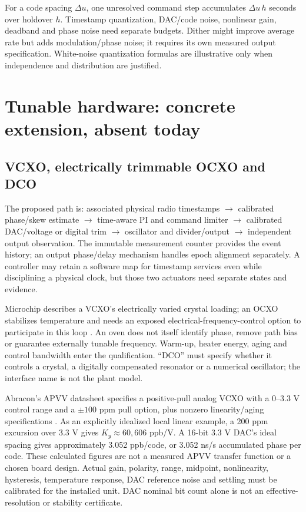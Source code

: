 \documentclass[11pt,letterpaper]{article}
\begin{document}
For a code spacing $\Delta u$, one unresolved command step accumulates $\Delta u\,h$ seconds over holdover $h$. Timestamp quantization, DAC/code noise, nonlinear gain, deadband and phase noise need separate budgets. Dither might improve average rate but adds modulation/phase noise; it requires its own measured output specification. White-noise quantization formulas are illustrative only when independence and distribution are justified.

\section{Tunable hardware: concrete extension, absent today}
\subsection{VCXO, electrically trimmable OCXO and DCO}
The proposed path is: associated physical radio timestamps $\rightarrow$ calibrated phase/skew estimate $\rightarrow$ time-aware PI and command limiter $\rightarrow$ calibrated DAC/voltage or digital trim $\rightarrow$ oscillator and divider/output $\rightarrow$ independent output observation. The immutable measurement counter provides the event history; an output phase/delay mechanism handles epoch alignment separately. A controller may retain a software map for timestamp services even while disciplining a physical clock, but those two actuators need separate states and evidence.

Microchip describes a VCXO's electrically varied crystal loading; an OCXO stabilizes temperature and needs an exposed electrical-frequency-control option to participate in this loop \cite{vcxo}. An oven does not itself identify phase, remove path bias or guarantee externally tunable frequency. Warm-up, heater energy, aging and control bandwidth enter the qualification. ``DCO'' must specify whether it controls a crystal, a digitally compensated resonator or a numerical oscillator; the interface name is not the plant model.

Abracon's APVV datasheet specifies a positive-pull analog VCXO with a 0--3.3 V control range and a $\pm100$ ppm pull option, plus nonzero linearity/aging specifications \cite{apvv}. As an explicitly idealized local linear example, a 200 ppm excursion over 3.3 V gives $K_y\approx60{,}606$ ppb/V. A 16-bit 3.3 V DAC's ideal spacing gives approximately 3.052 ppb/code, or 3.052 ns/s accumulated phase per code. These calculated figures are not a measured APVV transfer function or a chosen board design. Actual gain, polarity, range, midpoint, nonlinearity, hysteresis, temperature response, DAC reference noise and settling must be calibrated for the installed unit. DAC nominal bit count alone is not an effective-resolution or stability certificate.
\end{document}
